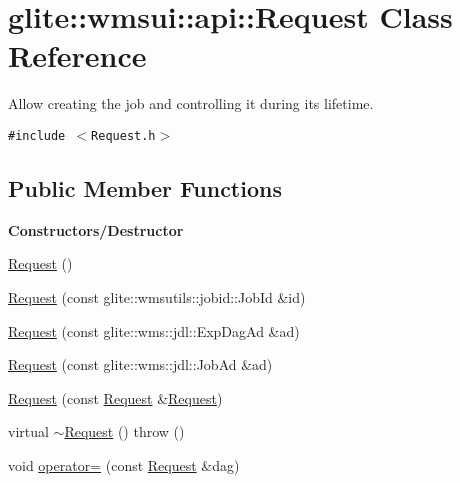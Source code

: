 \hypertarget{classglite_1_1wmsui_1_1api_1_1Request}{
\section{glite::wmsui::api::Request Class Reference}
\label{classglite_1_1wmsui_1_1api_1_1Request}
}
Allow creating the job and controlling it during its lifetime.  


{\tt \#include $<$Request.h$>$}

\subsection*{Public Member Functions}
\begin{Indent}{\bf Constructors/Destructor}\par
\begin{CompactItemize}
\item 
\hyperlink{classglite_1_1wmsui_1_1api_1_1Request_z9_0}{Request} ()
\item 
\hyperlink{classglite_1_1wmsui_1_1api_1_1Request_z9_1}{Request} (const glite::wmsutils::jobid::Job\-Id \&id)
\item 
\hyperlink{classglite_1_1wmsui_1_1api_1_1Request_z9_2}{Request} (const glite::wms::jdl::Exp\-Dag\-Ad \&ad)
\item 
\hyperlink{classglite_1_1wmsui_1_1api_1_1Request_z9_3}{Request} (const glite::wms::jdl::Job\-Ad \&ad)
\item 
\hyperlink{classglite_1_1wmsui_1_1api_1_1Request_z9_4}{Request} (const \hyperlink{classglite_1_1wmsui_1_1api_1_1Request}{Request} \&\hyperlink{classglite_1_1wmsui_1_1api_1_1Request}{Request})
\item 
virtual \hyperlink{classglite_1_1wmsui_1_1api_1_1Request_z9_5}{$\sim$Request} ()  throw ()
\item 
void \hyperlink{classglite_1_1wmsui_1_1api_1_1Request_z9_6}{operator=} (const \hyperlink{classglite_1_1wmsui_1_1api_1_1Request}{Request} \&dag)
\end{CompactItemize}
\end{Indent}
